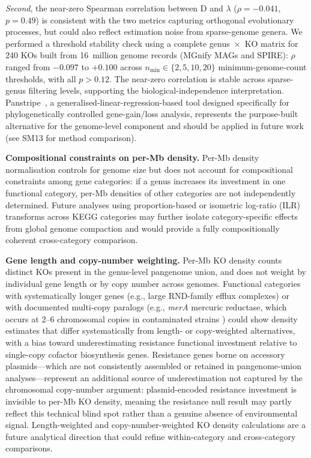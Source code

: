 \documentclass[times]{zHenriquesLab-StyleBioRxiv}
\begin{document}
\emph{Second}, the near-zero Spearman correlation between D and $\lambda$ ($\rho = -0.041$, $p = 0.49$) is consistent with the two metrics capturing orthogonal evolutionary processes, but could also reflect estimation noise from sparse-genome genera. We performed a threshold stability check using a complete genus~$\times$~KO matrix for 240 KOs built from 16~million genome records (MGnify MAGs and SPIRE): $\rho$ ranged from $-0.097$ to $+0.100$ across $n_\text{min} \in \{2, 5, 10, 20\}$ minimum-genome-count thresholds, with all $p > 0.12$. The near-zero correlation is stable across sparse-genus filtering levels, supporting the biological-independence interpretation. Panstripe~\cite{tonkinhill2023}, a generalised-linear-regression-based tool designed specifically for phylogenetically controlled gene-gain/loss analysis, represents the purpose-built alternative for the genome-level component and should be applied in future work (see SM13 for method comparison).

\textbf{Compositional constraints on per-Mb density.} Per-Mb density
normalisation controls for genome size but does not account for compositional
constraints among gene categories: if a genus increases its investment in one
functional category, per-Mb densities of other categories are not independently
determined. Future analyses using proportion-based or isometric log-ratio (ILR)
transforms across KEGG categories may further isolate category-specific effects
from global genome compaction and would provide a fully compositionally coherent
cross-category comparison.

\textbf{Gene length and copy-number weighting.} Per-Mb KO density counts
distinct KOs present in the genus-level pangenome union, and does not weight
by individual gene length or by copy number across genomes. Functional
categories with systematically longer genes (e.g., large RND-family efflux
complexes) or with documented multi-copy paralogs (e.g., \textit{merA}
mercuric reductase, which occurs at 2--6 chromosomal copies in contaminated
strains \cite{silver2005}) could show density estimates that differ
systematically from length- or copy-weighted alternatives, with a bias toward
underestimating resistance functional investment relative to single-copy
cofactor biosynthesis genes. Resistance genes borne on accessory
plasmids---which are not consistently assembled or retained in pangenome-union
analyses---represent an additional source of underestimation not captured by
the chromosomal copy-number argument: plasmid-encoded resistance investment is
invisible to per-Mb KO density, meaning the resistance null result may partly
reflect this technical blind spot rather than a genuine absence of
environmental signal. Length-weighted and copy-number-weighted KO
density calculations are a future analytical direction that could refine
within-category and cross-category comparisons.
\end{document}
